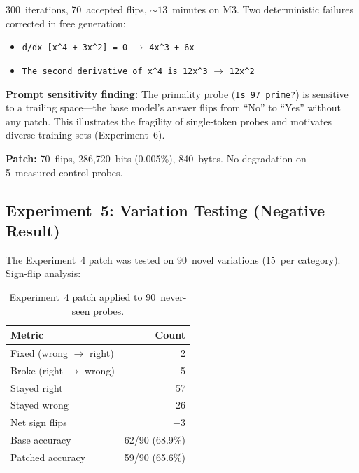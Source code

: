 \documentclass[11pt,a4paper]{article}
\begin{document}
300~iterations, 70~accepted flips, ${\sim}13$~minutes on M3. Two
deterministic failures corrected in free generation:

\begin{itemize}[nosep]
  \item \texttt{d/dx [x\^{}4 + 3x\^{}2] = 0}
    $\to$ \texttt{4x\^{}3 + 6x} \checkmark
  \item \texttt{The second derivative of x\^{}4 is 12x\^{}3}
    $\to$ \texttt{12x\^{}2} \checkmark
\end{itemize}

\textbf{Prompt sensitivity finding:} The primality probe
(\texttt{Is 97 prime?}) is sensitive to a trailing space---the base
model's answer flips from ``No'' to ``Yes'' without any patch. This
illustrates the fragility of single-token probes and motivates
diverse training sets (Experiment~6).

\textbf{Patch:} 70~flips, 286,720~bits (0.005\%), 840~bytes.
No degradation on 5~measured control probes.

\subsection{Experiment~5: Variation Testing (Negative Result)}

\noindent{}


The Experiment~4 patch was tested on 90~novel variations (15~per
category). Sign-flip analysis:

\begin{table}[h]
\centering
\caption{Experiment~4 patch applied to 90~never-seen probes.}
\begin{tabular}{@{}lr@{}}
\toprule
Metric & Count \\
\midrule
Fixed (wrong $\to$ right) & 2 \\
Broke (right $\to$ wrong) & 5 \\
Stayed right & 57 \\
Stayed wrong & 26 \\
\midrule
Net sign flips & $-3$ \\
Base accuracy & 62/90 (68.9\%) \\
Patched accuracy & 59/90 (65.6\%) \\
\bottomrule
\end{tabular}
\end{table}
\end{document}
